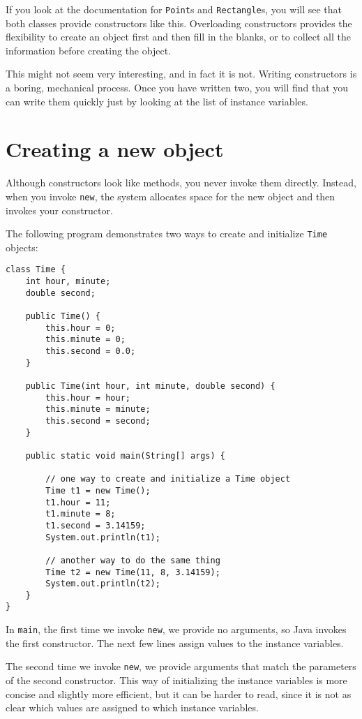 \documentclass[12pt]{book}
\theoremstyle{definition}
\begin{document}
If you look at the documentation for {\tt Point}s
and {\tt Rectangle}s, you will see that both classes provide
constructors like this.  Overloading constructors provides the
flexibility to create an object first and then fill in the
blanks, or to collect all the information before creating
the object.

This might not seem very interesting, and in fact it
is not.  Writing constructors is a boring, mechanical process.
Once you have written two, you will find that you can write them
quickly just by looking at the list of instance
variables.


\section{Creating a new object}

Although constructors look like methods, you never invoke them
directly.  Instead, when you invoke {\tt new}, the system
allocates space for the new object and then 
invokes your constructor.

The following program demonstrates two ways to create and
initialize {\tt Time} objects:

\begin{lstlisting}
class Time {
    int hour, minute;
    double second;

    public Time() {
        this.hour = 0;
        this.minute = 0;
        this.second = 0.0;
    }

    public Time(int hour, int minute, double second) {
        this.hour = hour;
        this.minute = minute;
        this.second = second;
    }

    public static void main(String[] args) {

        // one way to create and initialize a Time object
        Time t1 = new Time();
        t1.hour = 11;
        t1.minute = 8;
        t1.second = 3.14159;
        System.out.println(t1);

        // another way to do the same thing
        Time t2 = new Time(11, 8, 3.14159);
        System.out.println(t2);
    }
}
\end{lstlisting}
%
In {\tt main}, the first time we invoke {\tt new},
we provide no arguments, so Java invokes the first constructor.
The next few lines assign values to the instance
variables.

The second time we invoke {\tt new}, we provide
arguments that match the parameters of the second constructor.
This way of initializing the instance variables is more concise
and slightly more efficient, but it can be harder to read, since
it is not as clear which values are assigned to which instance
variables.
\end{document}
